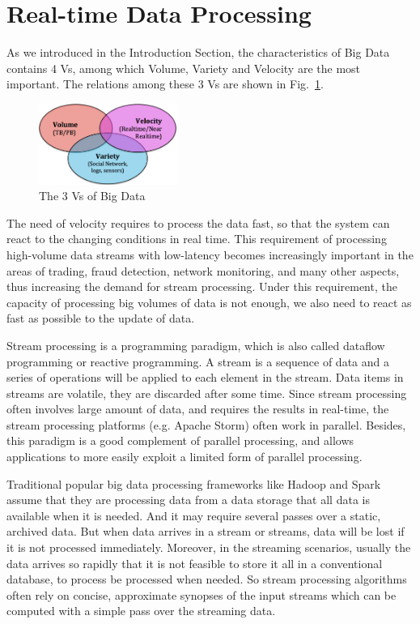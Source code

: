 \documentclass[	DIV=calc,%
							paper=a4,%
							fontsize=11pt,%
							twocolumn]{scrartcl}	 					%
\begin{document}
\section*{\color{DarkOrange} Real-time Data Processing}

As we introduced in the Introduction Section, the characteristics of Big Data contains 4 Vs, among which Volume, Variety and Velocity are the most important. The relations among these 3 Vs are shown in Fig.~\ref{fig:3v}.

\begin{figure}
  \centering
    \includegraphics[width=0.4\textwidth]{images/3v.png}
    \caption{The 3 Vs of Big Data}
    \label{fig:3v}   
\end{figure}

The need of velocity requires to process the data fast, so that the system can react to the changing conditions in  real time. This requirement of processing high-volume data streams with low-latency becomes increasingly important in the areas of trading, fraud detection, network monitoring, and many other aspects, thus increasing the demand for stream processing. Under this requirement, the capacity of processing big volumes of data is not enough, we also need to react as fast as possible to the update of data.

Stream processing is a programming paradigm, which is also called dataflow programming or reactive programming. A stream is a sequence of data and a series of operations will be applied to each element in the stream. Data items in streams are volatile, they are discarded after some time. Since stream processing often involves large amount of data, and requires the results in real-time, the stream processing platforms (e.g. Apache Storm) often work in parallel. Besides, this paradigm is a good complement of parallel processing, and allows applications to more easily exploit a limited form of parallel processing.  

Traditional popular big data processing frameworks like Hadoop and Spark assume that they are processing data from a data storage that all data is available when it is needed. And it may require several passes over a static, archived data. But when data arrives in a stream or streams, data will be lost if it is not processed immediately. Moreover, in the streaming scenarios, usually the data arrives so rapidly that it is not feasible to store it all in a conventional database, to process be processed when needed. So stream processing algorithms often rely on concise, approximate synopses of the input streams which can be computed with a simple pass over the streaming data.
\end{document}
